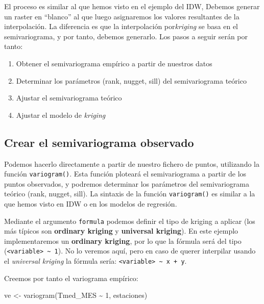 \documentclass[
  letterpaper,
  DIV=11,
  numbers=noendperiod]{scrreprt}
\newenvironment{Shaded}{\begin{snugshade}}{\end{snugshade}}
\newcommand{\DecValTok}[1]{\textcolor[rgb]{0.68,0.00,0.00}{#1}}
\newcommand{\FunctionTok}[1]{\textcolor[rgb]{0.28,0.35,0.67}{#1}}
\newcommand{\NormalTok}[1]{\textcolor[rgb]{0.00,0.23,0.31}{#1}}
\newcommand{\OtherTok}[1]{\textcolor[rgb]{0.00,0.23,0.31}{#1}}
\newcommand{\SpecialCharTok}[1]{\textcolor[rgb]{0.37,0.37,0.37}{#1}}
\providecommand{\tightlist}{%
  \setlength{\itemsep}{0pt}\setlength{\parskip}{0pt}}\usepackage{longtable,booktabs,array}
\begin{document}
El proceso es similar al que hemos visto en el ejemplo del IDW, Debemos
generar un raster en ``blanco'' al que luego asignaremos los valores
resultantes de la interpolación. La diferencia es que la interpolación
por\emph{kriging} se basa en el semivariograma, y por tanto, debemos
generarlo. Los pasos a seguir serán por tanto:

\begin{enumerate}
\def\labelenumi{\arabic{enumi}.}
\tightlist
\item
  Obtener el semivariograma empírico a partir de nuestros datos
\item
  Determinar los parámetros (rank, nugget, sill) del semivariograma
  teórico
\item
  Ajustar el semivariograma teórico
\item
  Ajustar el modelo de \emph{kriging}
\end{enumerate}

\hypertarget{crear-el-semivariograma-observado}{%
\subsection{Crear el semivariograma
observado}\label{crear-el-semivariograma-observado}}

Podemos hacerlo directamente a partir de nuestro fichero de puntos,
utilizando la función \texttt{variogram()}. Esta función ploteará el
semivariograma a partir de los puntos observados, y podremos determinar
los parámetros del semivariograma teórico (rank, nugget, sill). La
sintaxis de la función \texttt{variogram()} es similar a la que hemos
visto en IDW o en los modelos de regresión.

Mediante el argumento \texttt{formula} podemos definir el tipo de
kriging a aplicar (los más típicos son \textbf{ordinary kriging} y
\textbf{universal kriging}). En este ejemplo implementaremos un
\textbf{ordinary kriging}, por lo que la fórmula será del tipo
(\texttt{\textless{}variable\textgreater{}\ \textasciitilde{}\ 1}). No
lo veremos aquí, pero en caso de querer interpilar usando el
\emph{universal kriging} la fórmula sería:
\texttt{\textless{}variable\textgreater{}\ \textasciitilde{}\ x\ +\ y}.

Creemos por tanto el variograma empírico:

\begin{Shaded}
\begin{Highlighting}[]
\NormalTok{ve }\OtherTok{\textless{}{-}} \FunctionTok{variogram}\NormalTok{(Tmed\_MES }\SpecialCharTok{\textasciitilde{}} \DecValTok{1}\NormalTok{, estaciones)}
\end{Highlighting}
\end{Shaded}
\end{document}
